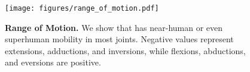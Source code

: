\begin{figure}
  \centering
  \texttt{[image: figures/range\_of\_motion.pdf]}
  \caption{\textbf{Range of Motion.} We show that \system has near-human or even superhuman mobility in most joints. Negative values represent extensions, adductions, and inversions, while flexions, abductions, and eversions are positive.}
  \label{fig:rom}
  \vspace{-5mm}
\end{figure}